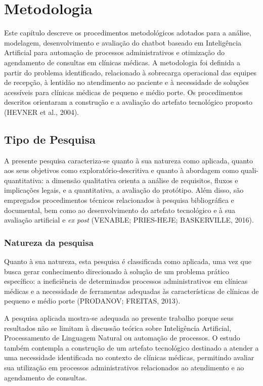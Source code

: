 \documentclass[12pt,a4paper]{extarticle}
\begin{document}
\newpage
\section{Metodologia}
\label{cap:metodologia}

Este capítulo descreve os procedimentos metodológicos adotados para a análise, modelagem, desenvolvimento e avaliação do chatbot baseado em Inteligência Artificial para automação de processos administrativos e otimização do agendamento de consultas em clínicas médicas. A metodologia foi definida a partir do problema identificado, relacionado à sobrecarga operacional das equipes de recepção, à lentidão no atendimento ao paciente e à necessidade de soluções acessíveis para clínicas médicas de pequeno e médio porte. Os procedimentos descritos orientaram a construção e a avaliação do artefato tecnológico proposto (HEVNER et al., 2004).

\subsection{Tipo de Pesquisa}

A presente pesquisa caracteriza-se quanto à sua natureza como aplicada, quanto aos seus objetivos como exploratório-descritiva e quanto à abordagem como quali-quantitativa: a dimensão qualitativa orienta a análise de requisitos, fluxos e implicações legais, e a quantitativa, a avaliação do protótipo. Além disso, são empregados procedimentos técnicos relacionados à pesquisa bibliográfica e documental, bem como ao desenvolvimento do artefato tecnológico e à sua avaliação artificial e \textit{ex post} (VENABLE; PRIES-HEJE; BASKERVILLE, 2016).

\subsubsection{Natureza da pesquisa}

Quanto à sua natureza, esta pesquisa é classificada como aplicada, uma vez que busca gerar conhecimento direcionado à solução de um problema prático específico: a ineficiência de determinados processos administrativos em clínicas médicas e a necessidade de ferramentas adequadas às características de clínicas de pequeno e médio porte (PRODANOV; FREITAS, 2013).

A pesquisa aplicada mostra-se adequada ao presente trabalho porque seus resultados não se limitam à discussão teórica sobre Inteligência Artificial, Processamento de Linguagem Natural ou automação de processos. O estudo também contempla a construção de um artefato tecnológico destinado a atender a uma necessidade identificada no contexto de clínicas médicas, permitindo avaliar sua utilização em processos administrativos relacionados ao atendimento e ao agendamento de consultas.
\end{document}
